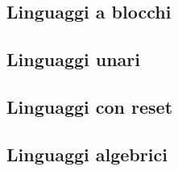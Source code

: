 \chapter{}



\section{Linguaggi a blocchi}



\section{Linguaggi unari}



\section{Linguaggi con reset}



\section{Linguaggi algebrici}
